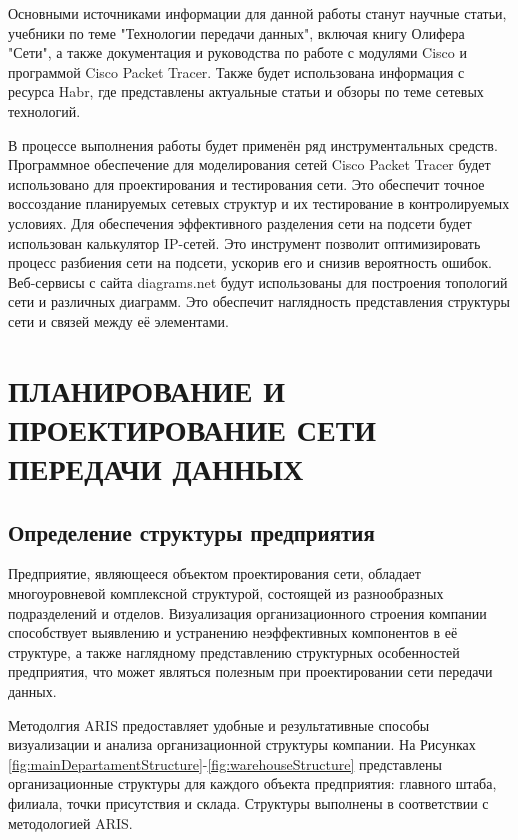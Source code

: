 \documentclass[14pt, a4paper]{extarticle}
\numberwithin{equation}{section}
\begin{document}
Основными источниками информации 
для данной работы станут научные статьи, 
учебники по теме "Технологии передачи данных", 
включая книгу Олифера "Сети", 
а также документация и руководства по работе 
с модулями Cisco и программой 
Cisco Packet Tracer. Также будет использована 
информация с ресурса Habr, 
где представлены актуальные статьи и обзоры 
по теме сетевых технологий.

В процессе выполнения работы будет применён ряд 
инструментальных средств. 
Программное обеспечение для моделирования сетей Cisco 
Packet Tracer будет использовано для проектирования 
и тестирования сети. Это обеспечит точное 
воссоздание планируемых сетевых структур и их 
тестирование в контролируемых условиях. 
Для обеспечения эффективного разделения сети на 
подсети будет использован калькулятор IP-сетей. 
Это инструмент позволит оптимизировать процесс 
разбиения сети на подсети, ускорив его и 
снизив вероятность ошибок. Веб-сервисы с сайта 
diagrams.net будут использованы для построения 
топологий сети и различных диаграмм. 
Это обеспечит наглядность представления 
структуры сети и связей между её элементами.


\section{ПЛАНИРОВАНИЕ И ПРОЕКТИРОВАНИЕ СЕТИ ПЕРЕДАЧИ ДАННЫХ}

\subsection{Определение структуры предприятия}
Предприятие, являющееся объектом проектирования сети, обладает многоуровневой 
комплексной структурой, состоящей из разнообразных подразделений и отделов. 
Визуализация организационного строения компании способствует выявлению и устранению
неэффективных компонентов в её структуре, а также наглядному представлению структурных
особенностей предприятия, что может являться полезным при проектировании сети передачи
данных.


Методолгия ARIS предоставляет удобные и результативные 
способы визуализации и анализа организационной структуры компании. На Рисунках 
\ref{fig:mainDepartamentStructure}-\ref{fig:warehouseStructure} представлены
организационные структуры для каждого объекта предприятия: главного штаба, филиала, точки присутствия и склада. Структуры выполнены в соответствии с методологией ARIS.
\end{document}
